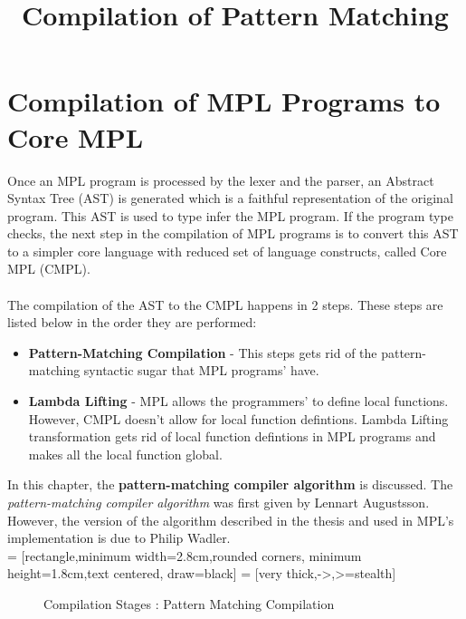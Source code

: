 \documentclass[11pt]{article}
\title{Compilation of Pattern Matching}
\begin{document}
\maketitle
\section {Compilation of MPL Programs to Core MPL}

Once an MPL program is processed by the lexer and the parser, an Abstract Syntax Tree (AST) is generated which is a faithful representation of the original program. This AST is used to type infer the MPL program. If the program type checks, the next step in the compilation of MPL programs is to convert this AST to a simpler core language with reduced set of language constructs, called Core MPL (CMPL).
~~\\~~\\ 
The compilation of the AST to the CMPL happens in 2 steps. These steps are listed below in the order they are performed:
\begin {itemize}
  \item {\bf Pattern-Matching Compilation} - This steps gets rid of the pattern-matching syntactic sugar that MPL programs' have.  
  \item {\bf Lambda Lifting} - MPL allows the programmers' to define local functions. However, CMPL doesn't allow for local function defintions. Lambda Lifting transformation gets rid of local function defintions in MPL programs and makes all the local function global.
\end{itemize}
In this chapter, the {\bf pattern-matching compiler algorithm} is discussed. The {\em pattern-matching compiler algorithm} was first given by Lennart Augustsson. However, the version of the algorithm described in the thesis and used in MPL's implementation is due to Philip Wadler.
~~\\
 = [rectangle,minimum width=2.8cm,rounded corners,
                     minimum height=1.8cm,text centered, draw=black]
 = [very thick,->,>=stealth]
\begin{figure}[h!]
\begin {center}
\caption{Compilation Stages : Pattern Matching Compilation} \label{fig:Pmatch:Overview}
\end{center}
\end{figure}
\end{document}
